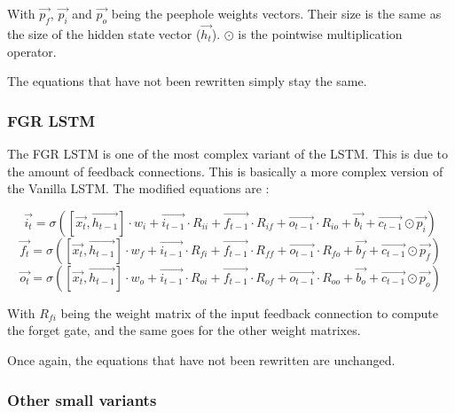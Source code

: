 With $\overrightarrow{p_f}$, $\overrightarrow{p_i}$ and $\overrightarrow{p_o}$ being the peephole weights vectors. Their size is the same as the size of the hidden state vector ($\overrightarrow{h_t}$). $\odot$ is the pointwise multiplication operator.

The equations that have not been rewritten simply stay the same.

\subsubsection{\acl{FGR} \ac{LSTM}}
The \ac{FGR} \ac{LSTM} is one of the most complex variant of the \ac{LSTM}. This is due to the amount of feedback connections. This is basically a more complex version of the Vanilla \ac{LSTM}. The modified equations are :

\begin{equation}\label{eq:inputGFGR}
  \overrightarrow{i_t}=\sigma ([\overrightarrow{x_{t}},\overrightarrow{h_{t-1}}]\cdot w_i  + \overrightarrow{i_{t-1}}\cdot R_{ii} + \overrightarrow{f_{t-1}}\cdot R_{if} + \overrightarrow{o_{t-1}}\cdot R_{io} + \overrightarrow{b_i} +\overrightarrow{c_{t-1}}\odot \overrightarrow{p_i})
\end{equation}
\begin{equation}\label{eq:forgetGFGR}
  \overrightarrow{f_t}=\sigma ([\overrightarrow{x_{t}},\overrightarrow{h_{t-1}}]\cdot w_f  + \overrightarrow{i_{t-1}}\cdot R_{fi} + \overrightarrow{f_{t-1}}\cdot R_{ff} + \overrightarrow{o_{t-1}}\cdot R_{fo} + \overrightarrow{b_f} +\overrightarrow{c_{t-1}}\odot \overrightarrow{p_f})
\end{equation}
\begin{equation}\label{eq:ouputGFGR}
  \overrightarrow{o_t}=\sigma ([\overrightarrow{x_{t}},\overrightarrow{h_{t-1}}]\cdot w_o + \overrightarrow{i_{t-1}}\cdot R_{oi} + \overrightarrow{f_{t-1}}\cdot R_{of} + \overrightarrow{o_{t-1}}\cdot R_{oo} + \overrightarrow{b_o} +\overrightarrow{c_{t-1}}\odot \overrightarrow{p_o})
\end{equation}

With $R_{fi}$ being the weight matrix of the input feedback connection to compute the forget gate, and the same goes for the other weight matrixes.

Once again, the equations that have not been rewritten are unchanged.

\subsubsection{Other small variants}

